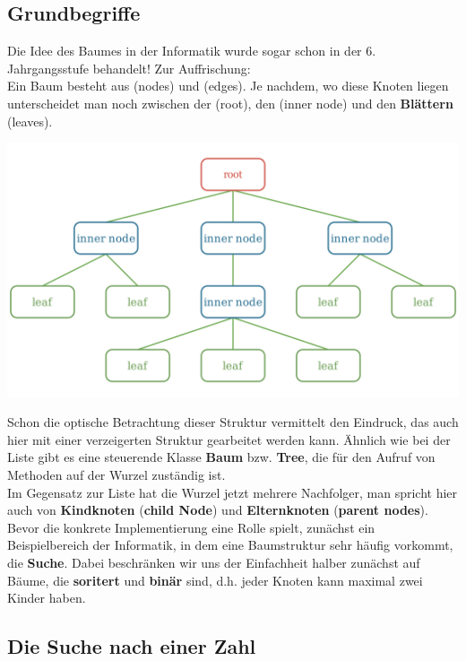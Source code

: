 \documentclass{article}
\begin{document}
\subsection{Grundbegriffe}

Die Idee des Baumes in der Informatik wurde sogar schon in der 6. Jahrgangsstufe behandelt! Zur Auffrischung: \\
Ein Baum besteht aus  (nodes) und  (edges). Je nachdem, wo diese Knoten liegen unterscheidet man noch zwischen der  (root), den  (inner node) und den \textbf{Blättern} (leaves).
\begin{center}
    \includegraphics[scale=0.2]{../../media/tree_example.png}
\end{center}
Schon die optische Betrachtung dieser Struktur vermittelt den Eindruck, das auch hier mit einer verzeigerten Struktur gearbeitet werden kann. Ähnlich wie bei der Liste gibt es eine steuerende Klasse \textbf{Baum} bzw. \textbf{Tree}, die für den Aufruf von Methoden auf der Wurzel zuständig ist. \\
Im Gegensatz zur Liste hat die Wurzel jetzt mehrere Nachfolger, man spricht hier auch von \textbf{Kindknoten} (\textbf{child Node}) und \textbf{Elternknoten} (\textbf{parent nodes}). \\
Bevor die konkrete Implementierung eine Rolle spielt, zunächst ein Beispielbereich der Informatik, in dem eine Baumstruktur sehr häufig vorkommt, die \textbf{Suche}. Dabei beschränken wir uns der Einfachheit halber zunächst auf Bäume, die \textbf{soritert} und \textbf{binär} sind, d.h. jeder Knoten kann maximal zwei Kinder haben.

\subsection{Die Suche nach einer Zahl}
\end{document}

